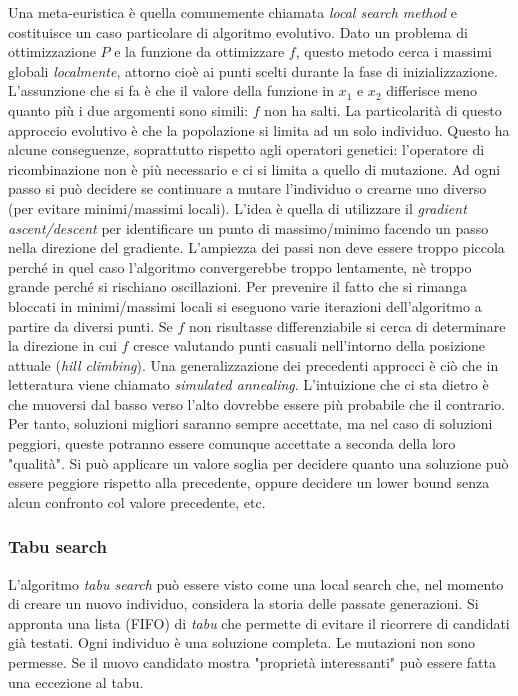 \documentclass[10pt,a4paper]{article}
\begin{document}
Una meta-euristica è quella comunemente chiamata \emph{local search method} e costituisce un caso particolare di algoritmo evolutivo. Dato un problema di ottimizzazione $P$ e la funzione da ottimizzare $f$, questo metodo cerca i massimi globali \emph{localmente}, attorno cioè ai punti scelti durante la fase di inizializzazione. L'assunzione che si fa è che il valore della funzione in $x_1$ e $x_2$ differisce meno quanto più i due argomenti sono simili: $f$ non ha salti. 
La particolarità di questo approccio evolutivo è che la popolazione si limita ad un solo individuo. Questo ha alcune conseguenze, soprattutto rispetto agli operatori genetici: l'operatore di ricombinazione non è più necessario e ci si limita a quello di mutazione. Ad ogni passo si può decidere se continuare a mutare l'individuo o crearne uno diverso (per evitare minimi/massimi locali). L'idea è quella di utilizzare il \emph{gradient ascent/descent} per identificare un punto di massimo/minimo facendo un passo nella direzione del gradiente. L'ampiezza dei passi non deve essere troppo piccola perché in quel caso l'algoritmo convergerebbe troppo lentamente, nè troppo grande perché si rischiano oscillazioni. Per prevenire il fatto che si rimanga bloccati in minimi/massimi locali si eseguono varie iterazioni dell'algoritmo a partire da diversi punti. Se $f$ non risultasse differenziabile si cerca di determinare la direzione in cui $f$ cresce valutando punti casuali nell'intorno della posizione attuale (\emph{hill climbing}). Una generalizzazione dei precedenti approcci è ciò che in letteratura viene chiamato \emph{simulated annealing}. L'intuizione che ci sta dietro è che muoversi dal basso verso l'alto dovrebbe essere più probabile che il contrario. Per tanto, soluzioni migliori saranno sempre accettate, ma nel caso di soluzioni peggiori, queste potranno essere comunque accettate a seconda della loro "qualità". Si può applicare un valore soglia per decidere quanto una soluzione può essere peggiore rispetto alla precedente, oppure decidere un lower bound senza alcun confronto col valore precedente, etc.

\subsubsection{Tabu search}

L'algoritmo \emph{tabu search} può essere visto come una local search che, nel momento di creare un nuovo individuo, considera la storia delle passate generazioni. Si appronta una lista (FIFO) di \emph{tabu} che permette di evitare il ricorrere di candidati già testati. Ogni individuo è una soluzione completa. Le mutazioni non sono permesse. Se il nuovo candidato mostra "proprietà interessanti" può essere fatta una eccezione al tabu.
\end{document}
